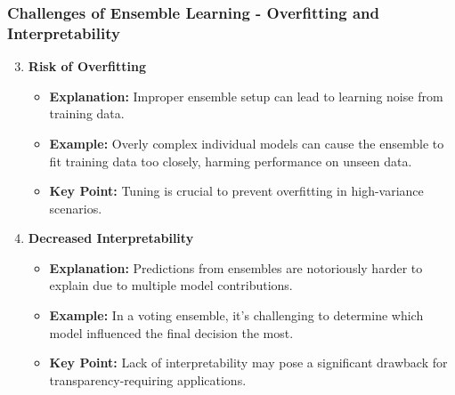 \documentclass[aspectratio=169]{beamer}
\begin{document}
\begin{frame}[fragile]
    \frametitle{Challenges of Ensemble Learning - Overfitting and Interpretability}
    \begin{enumerate}
        \setcounter{enumi}{2}
        \item \textbf{Risk of Overfitting}
            \begin{itemize}
                \item \textbf{Explanation:} Improper ensemble setup can lead to learning noise from training data.
                \item \textbf{Example:} Overly complex individual models can cause the ensemble to fit training data too closely, harming performance on unseen data.
                \item \textbf{Key Point:} Tuning is crucial to prevent overfitting in high-variance scenarios.
            \end{itemize}
        \item \textbf{Decreased Interpretability}
            \begin{itemize}
                \item \textbf{Explanation:} Predictions from ensembles are notoriously harder to explain due to multiple model contributions.
                \item \textbf{Example:} In a voting ensemble, it's challenging to determine which model influenced the final decision the most.
                \item \textbf{Key Point:} Lack of interpretability may pose a significant drawback for transparency-requiring applications.
            \end{itemize}
    \end{enumerate}
\end{frame}
\end{document}
